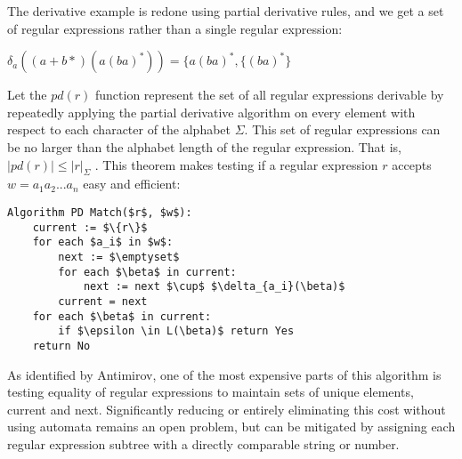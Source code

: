 The derivative example is redone using partial derivative rules, and we get a set of regular expressions rather than a single regular expression:
\begin{center}
  $\delta_a((a + b*) (a (ba)^*)) = \{a (ba)^*, \{(ba)^*\}$  
\end{center}

Let the $pd(r)$ function represent the set of all regular expressions derivable by repeatedly applying the partial derivative algorithm on every element with respect to each character of the alphabet $\Sigma$. This set of regular expressions can be no larger than the alphabet length of the regular expression. That is, $|pd(r)| \leq |r|_\Sigma$ \cite{Antimirov}. This theorem makes testing if a regular expression $r$ accepts $w = a_1a_2...a_n$ easy and efficient:

\begin{lstlisting}[label=alg:pd-match, caption={Partial derivative membership}]
Algorithm PD Match($r$, $w$):
    current := $\{r\}$
    for each $a_i$ in $w$:
        next := $\emptyset$
        for each $\beta$ in current:
            next := next $\cup$ $\delta_{a_i}(\beta)$
        current = next
    for each $\beta$ in current:
        if $\epsilon \in L(\beta)$ return Yes
    return No
\end{lstlisting}

As identified by Antimirov, one of the most expensive parts of this algorithm is testing equality of regular expressions to maintain sets of unique elements, current and next. Significantly reducing or entirely eliminating this cost without using automata remains an open problem, but can be mitigated by assigning each regular expression subtree with a directly comparable string or number.





